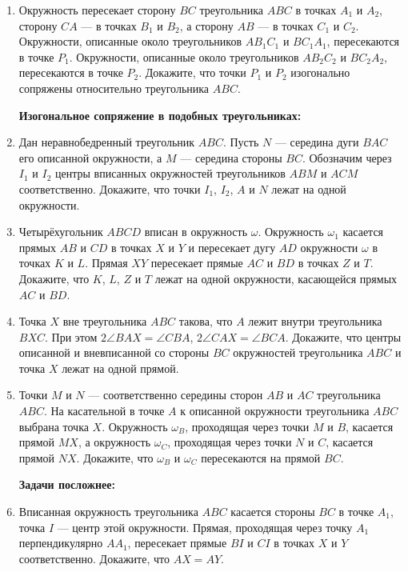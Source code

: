 \documentclass{article}
\begin{document}
\begin{enumerate}[label*=\protect\fbox{\arabic{enumi}}]
\item  Окружность пересекает сторону \(BC\) треугольника \(ABC\) в точках \(A_1\) и \(A_2\), сторону \(CA\) — в точках \(B_1\) и \(B_2\), а сторону \(AB\) — в точках \(C_1\) и \(C_2\). Окружности, описанные около треугольников \(AB_1C_1\) и \(BC_1A_1\), пересекаются в точке \(P_1\). Окружности, описанные около треугольников \(AB_2C_2\) и \(BC_2A_2\), пересекаются в точке \(P_2\). Докажите, что точки \(P_1\) и \(P_2\) изогонально сопряжены относительно треугольника \(ABC\).

\textbf{Изогональное сопряжение в подобных треугольниках:}

\item Дан неравнобедренный треугольник \(ABC\). Пусть \(N\) — середина дуги \(BAC\) его описанной окружности, а \(M\) — середина стороны \(BC\). Обозначим через \(I_1\) и \(I_2\) центры вписанных окружностей треугольников \(ABM\) и \(ACM\) соответственно. Докажите, что точки \(I_1\), \(I_2\), \(A\) и \(N\) лежат на одной окружности.

\item Четырёхугольник \(ABCD\) вписан в окружность \(\omega\). Окружность \(\omega_1\) касается прямых \(AB\) и \(CD\) в точках \(X\) и \(Y\) и пересекает дугу \(AD\) окружности \(\omega\) в точках \(K\) и \(L\). Прямая \(XY\) пересекает прямые \(AC\) и \(BD\) в точках \(Z\) и \(T\). Докажите, что \(K\), \(L\), \(Z\) и \(T\) лежат на одной окружности, касающейся прямых \(AC\) и \(BD\).

\item Точка \(X\) вне треугольника \(ABC\) такова, что \(A\) лежит внутри треугольника \(BXC\). При этом \(2\angle BAX = \angle CBA\), \(2\angle CAX = \angle BCA\). Докажите, что центры описанной и вневписанной со стороны \(BC\) окружностей треугольника \(ABC\) и точка \(X\) лежат на одной прямой.

\item Точки \(M\) и \(N\) — соответственно середины сторон \(AB\) и \(AC\) треугольника \(ABC\). На касательной в точке \(A\) к описанной окружности треугольника \(ABC\) выбрана точка \(X\). Окружность \(\omega_B\), проходящая через точки \(M\) и \(B\), касается прямой \(MX\), а окружность \(\omega_C\), проходящая через точки \(N\) и \(C\), касается прямой \(NX\). Докажите, что \(\omega_B\) и \(\omega_C\) пересекаются на прямой \(BC\).

\textbf{Задачи посложнее:}

\item Вписанная окружность треугольника \(ABC\) касается стороны \(BC\) в точке \(A_1\), точка \(I\) — центр этой окружности. Прямая, проходящая через точку \(A_1\) перпендикулярно \(AA_1\), пересекает прямые \(BI\) и \(CI\) в точках \(X\) и \(Y\) соответственно. Докажите, что \(AX = AY\).


\end{enumerate}
\end{document}
